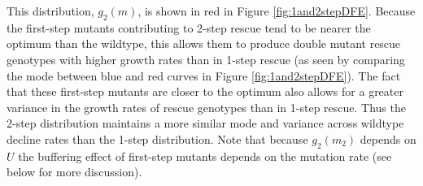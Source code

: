 \documentclass[9pt,twocolumn,twoside,lineno]{gsajnl}
\begin{document}
\noindent This distribution, $g_2(m)$, is shown in red in Figure \ref{fig:1and2stepDFE}.
Because the first-step mutants contributing to 2-step rescue tend to be nearer the optimum than the wildtype, this allows them to produce double mutant rescue genotypes with higher growth rates than in 1-step rescue (as seen by comparing the mode between blue and red curves in Figure \ref{fig:1and2stepDFE}).
The fact that these first-step mutants are closer to the optimum also allows for a greater variance in the growth rates of rescue genotypes than in 1-step rescue.
Thus the 2-step distribution maintains a more similar mode and variance across wildtype decline rates than the 1-step distribution. 
Note that because $g_2(m_2)$ depends on $U$ the buffering effect of first-step mutants depends on the mutation rate (see  below for more discussion).
\end{document}
